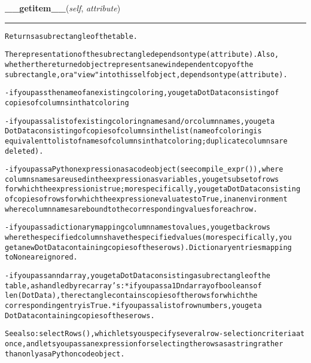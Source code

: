\hspace{.8\funcindent}\begin{boxedminipage}{\funcwidth}

    \raggedright \textbf{\_\_getitem\_\_}(\textit{self}, \textit{attribute})

    \vspace{-1.5ex}

    \rule{\textwidth}{0.5\fboxrule}
\setlength{\parskip}{2ex}
\begin{alltt}
Returns a subrectangle of the table.

The representation of the subrectangle depends on type(attribute). Also,
whether the returned object represents a new independent copy of the
subrectangle, or a "view" into this self object, depends on type(attribute).

- if you pass the name of an existing coloring, you get a DotData consisting of
copies of columns in that coloring

- if you pass a list of existing coloring names and/or column names, you get a
DotData consisting of copies of columns in the list (name of coloring is
equivalent to list of names of columns in that coloring; duplicate columns are
deleted).

- if you pass a Python expression as a code object (see compile\_expr()), where
columns names are used in the expression as variables, you get subset of rows
for which the expression is true; more specifically, you get a DotData consisting
of copies of rows for which the expression evaluates to True, in an environment
where column names are bound to the corresponding values for each row.

- if you pass a dictionary mapping column names to values, you get back rows
where the specified columns have the specified values (more specifically, you
get a new DotData containing copies of these rows). Dictionary entries mapping
to None are ignored.

- if you pass an ndarray, you get a DotData consisting a subrectangle of the
table, as handled by recarray's: * if you pass a 1D ndarray of booleans of
len(DotData), the rectangle contains copies of the rows for which the
corresponding entry is True. * if you pass a list of row numbers, you get a
DotData containing copies of these rows.


See also: selectRows(), which lets you specify several row-selection criteria at
once, and lets you pass an expression for selecting the rows as a string rather
than only as a Python code object.
\end{alltt}

\setlength{\parskip}{1ex}
    \end{boxedminipage}


